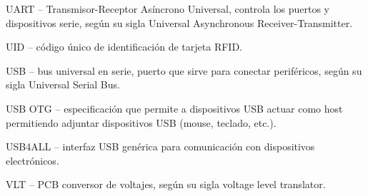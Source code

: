 \begin{glosario}
UART – Transmisor-Receptor Asíncrono Universal, controla los puertos y dispositivos serie, según su sigla Universal Asynchronous Receiver-Transmitter.

UID – código único de identificación de tarjeta RFID.

USB – bus universal en serie, puerto que sirve para conectar periféricos, según su sigla Universal Serial Bus.

USB OTG – especificación que permite a dispositivos USB actuar como host permitiendo adjuntar dispositivos USB (mouse, teclado, etc.).

USB4ALL – interfaz USB genérica para comunicación con dispositivos electrónicos.

VLT – PCB conversor de voltajes, según su sigla voltage level translator.

\end{glosario}
